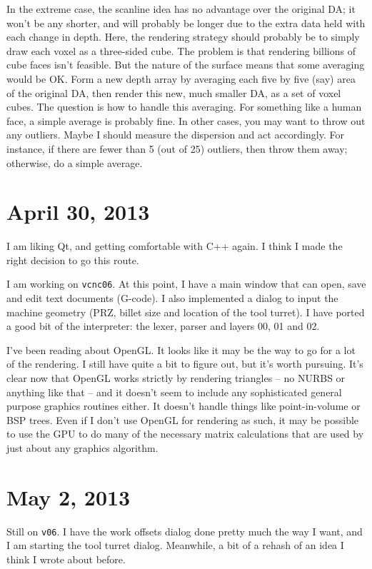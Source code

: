 \documentclass[titlepage,oneside,10pt]{article}
\begin{document}
In the extreme case, the scanline idea has no advantage over the
original DA; it won't be any shorter, and will probably be longer due
to the extra data held with each change in depth. Here, the rendering
strategy should probably be to simply draw each voxel as a three-sided
cube. The problem is that rendering billions of cube faces isn't
feasible. But the nature of the surface means that some averaging
would be OK. Form a new depth array by averaging each five by five
(say) area of the original DA, then render this new, much smaller DA,
as a set of voxel cubes. The question is how to handle this
averaging. For something like a human face, a simple average is
probably fine. In other cases, you may want to throw out any
outliers. Maybe I should measure the dispersion and act
accordingly. For instance, if there are fewer than 5 (out of 25)
outliers, then throw them away; otherwise, do a simple average.


\section{April 30, 2013}

I am liking Qt, and getting comfortable with C++ again. I think I made
the right decision to go this route. 

I am working on {\tt vcnc06}. At this point, I have a main window that
can open, save and edit text documents (G-code). I also implemented a
dialog to input the machine geometry (PRZ, billet size and location of
the tool turret). I have ported a good bit of the interpreter: the
lexer, parser and layers 00, 01 and 02.

I've been reading about OpenGL. It looks like it may be the way to go
for a lot of the rendering. I still have quite a bit to figure out,
but it's worth pursuing. It's clear now that OpenGL works strictly by
rendering triangles -- no NURBS or anything like that -- and it
doesn't seem to include any sophisticated general purpose graphics
routines either. It doesn't handle things like point-in-volume or BSP
trees. Even if I don't use OpenGL for rendering as such, it may be
possible to use the GPU to do many of the necessary matrix
calculations that are used by just about any graphics algorithm.

\section{May 2, 2013}

Still on {\tt v06}. I have the work offsets dialog done pretty much
the way I want, and I am starting the tool turret dialog. Meanwhile, a
bit of a rehash of an idea I think I wrote about before.
\end{document}
